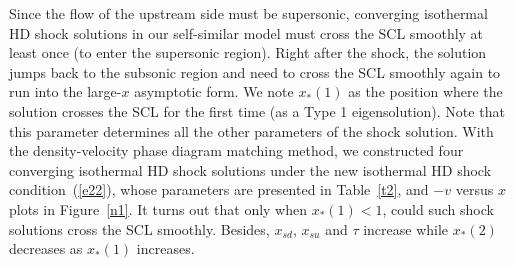 \documentclass[fleqn,usenatbib]{mnras}
\begin{document}
Since the flow of the upstream side must be supersonic, converging isothermal HD shock solutions in our self-similar model must cross the SCL smoothly at least once (to enter the supersonic region). Right after the shock, the solution jumps back to the subsonic region and need to cross the SCL smoothly again to run into the large-$x$ asymptotic form. We note $x_{*}(1)$ as the position where the solution crosses the SCL for the first time (as a Type 1 eigensolution). Note that this parameter determines all the other parameters of the shock solution. With the density-velocity phase diagram matching method, we constructed four converging isothermal HD shock solutions under the new isothermal HD shock condition~(\ref{e22}), whose parameters are presented in Table~\ref{t2}, and $-v$ versus $x$ plots in Figure~\ref{n1}. 
It turns out that only when $x_{*}(1)<1$, could such shock solutions cross the SCL smoothly. Besides, $x_{sd}$, $x_{su}$ and $\tau$ increase while $x_{*}(2)$ decreases as $x_{*}(1)$ increases.
\end{document}
